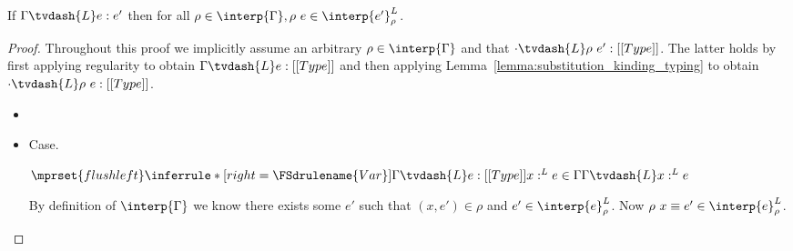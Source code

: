 \begin{thm}
  \label{thm:type_soundness}
  If $\Gamma \tvdash{L} e:e'$ then for all 
  $\rho \in \interp{\Gamma}, \rho\ e \in \interp{e'}^L_\rho$.
\end{thm}
\begin{proof}
  Throughout this proof we implicitly assume an arbitrary $\rho \in \interp{\Gamma}$ and
  that $\cdot \tvdash{L} \rho\ e':[[Type]]$.  The latter holds by first applying regularity to obtain
  $\Gamma \tvdash{L} e:[[Type]]$ and then applying Lemma~\ref{lemma:substitution_kinding_typing} to
  obtain $\cdot \tvdash{L}\rho\ e:[[Type]]$.
  
  \begin{itemize}
  \item[]\ \\
    
  \item[]Case.\ \\
    \begin{center}
      \begin{math}
        $$\mprset{flushleft}
        \inferrule* [right=\FSdrulename{Var}]{
          \Gamma \tvdash{L} e:[[Type]]
          \\\\
          x:^{L} e \in \Gamma
        }{\Gamma \tvdash{L} x:^{L} e}
      \end{math}
    \end{center}
    By definition of $\interp{\Gamma}$ we know there exists some $e'$
    such that $(x,e') \in \rho$ and $e' \in \interp{e}^L_\rho$.
    Now $\rho\ x \equiv e' \in \interp{e}^L_\rho$.
    

\end{itemize}
\end{proof}
